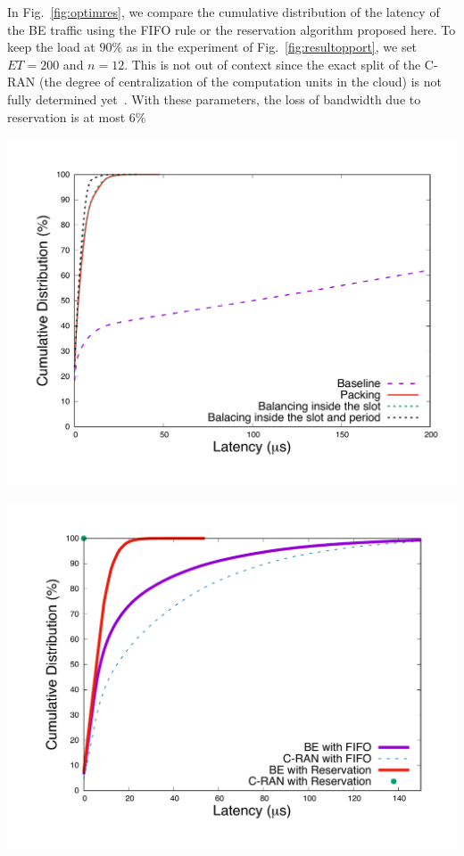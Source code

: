 \documentclass[10pt, conference, letterpaper]{IEEEtran}
\begin{document}
In Fig.~\ref{fig:optimres}, we compare the cumulative distribution of the latency of the BE traffic using the FIFO rule or the reservation algorithm proposed here. To keep the load at $90\%$ as in the experiment of Fig.~\ref{fig:resultopport}, we set $ET = 200$ and $n = 12$. This is not out of context since the exact split of the C-RAN (the degree of centralization of the computation units in the cloud) is not fully determined yet~\cite{mobile2011c}. With these parameters, the loss of bandwidth due to reservation is at most $6\%$
 

\begin{center}
      \includegraphics[scale=0.25]{repart1res}
        \label{fig:algocmp}

\vspace{0.5cm}

      \includegraphics[scale=0.25]{optim.pdf}
        \label{fig:optimres}
  
\end{center}
\end{document}
